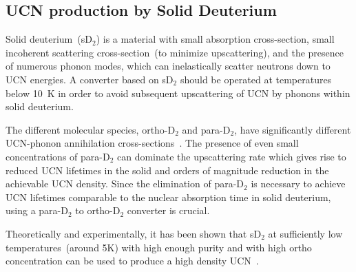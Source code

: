 


\subsection{UCN production by Solid Deuterium}
Solid deuterium~(sD$_2$) is a material with small absorption
cross-section, small incoherent scattering cross-section~(to minimize
upscattering), and the presence of numerous phonon modes, which can
inelastically scatter neutrons down to UCN energies.
A converter based on sD$_2$ should be operated at temperatures below
10~K in order to avoid subsequent upscattering of UCN by phonons
within solid deuterium.

The different molecular species, ortho-D$_2$ and para-D$_2$, have
significantly different UCN-phonon annihilation
cross-sections~\cite{Liu2000, Morris2002}. The presence of even small
concentrations of para-D$_2$ can dominate the upscattering rate which
gives rise to reduced UCN lifetimes in the solid and orders of
magnitude reduction in the achievable UCN density.
Since the elimination of para-D$_2$ is necessary to achieve UCN
lifetimes comparable to the nuclear absorption time in solid
deuterium, using a para-D$_2$ to ortho-D$_2$ converter is crucial.


Theoretically and experimentally, it has been shown that sD$_2$ at
sufficiently low temperatures~(around 5K) with high enough purity and
with high ortho concentration can be used to produce a high density
UCN~\cite{Atchison2005}.



